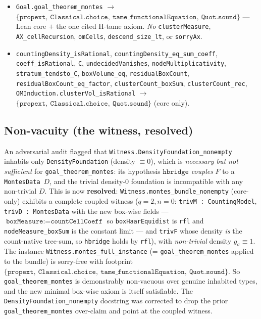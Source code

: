 \documentclass[11pt]{article}
\theoremstyle{definition}
\theoremstyle{remark}
\begin{document}
\begin{itemize}[nosep]
\item \texttt{Goal.goal\_theorem\_montes} $\to$
$\{\texttt{propext},\ \texttt{Classical.choice},\ \texttt{tame\_functionalEquation},\
\texttt{Quot.sound}\}$ --- Lean core $+$ the one cited H-tame axiom. \emph{No}
\texttt{clusterMeasure}, \texttt{AX\_cellRecursion}, \texttt{omCells},
\texttt{descend\_size\_lt}, or \texttt{sorryAx}.
\item \texttt{countingDensity\_isRational}, \texttt{countingDensity\_eq\_sum\_coeff},
\texttt{coeff\_isRational}, \texttt{C}, \texttt{undecidedVanishes},
\texttt{nodeMultiplicativity}, \texttt{stratum\_tendsto\_C}, \texttt{boxVolume\_eq},
\texttt{residualBoxCount}, \texttt{residualBoxCount\_eq\_factor},
\texttt{clusterCount\_boxSum}, \texttt{clusterCount\_rec},
\texttt{OMInduction.clusterVol\_isRational} $\to$
$\{\texttt{propext},\ \texttt{Classical.choice},\ \texttt{Quot.sound}\}$ (core only).
\end{itemize}

\subsection{Non-vacuity (the witness, resolved)}\label{sec:vacuity}

An adversarial audit flagged that \texttt{Witness.DensityFoundation\_nonempty}
inhabits only \texttt{DensityFoundation} (density $\equiv0$), which is \emph{necessary
but not sufficient} for \texttt{goal\_theorem\_montes}: its hypothesis
$\texttt{hbridge}$ \emph{couples} $F$ to a \texttt{MontesData}\ $D$, and the trivial
density-$0$ foundation is incompatible with any non-trivial $D$. This is now
\textbf{resolved}: \texttt{Witness.montes\_bundle\_nonempty} (core-only) exhibits a
complete coupled witness ($q=2,n=0$: \texttt{trivM : CountingModel},
\texttt{trivD : MontesData} with the new box-wise fields --- $\texttt{boxMeasure}
:= \texttt{countCellCoeff}$ so \texttt{boxHaarEquidist} is \texttt{rfl} and
\texttt{nodeMeasure\_boxSum} is the constant limit --- and \texttt{trivF} whose
density \emph{is} the count-native tree-sum, so \texttt{hbridge} holds by
\texttt{rfl}), with \emph{non-trivial} density $g_\sigma\equiv1$. The instance
\texttt{Witness.montes\_full\_instance} (= \texttt{goal\_theorem\_montes} applied to
the bundle) is sorry-free with footprint
$\{\texttt{propext},\ \texttt{Classical.choice},\ \texttt{tame\_functionalEquation},\
\texttt{Quot.sound}\}$. So \texttt{goal\_theorem\_montes} is demonstrably non-vacuous
over genuine inhabited types, and the new minimal box-wise axiom is itself
satisfiable. The \texttt{DensityFoundation\_nonempty} docstring was corrected to drop
the prior \texttt{goal\_theorem\_montes} over-claim and point at the coupled witness.
\end{document}
